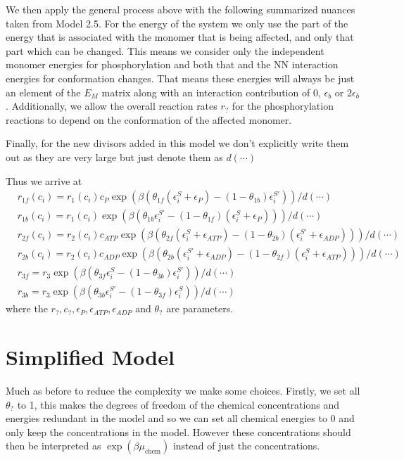 \documentclass[11pt]{article}
\begin{document}
\begin{tcolorbox}
	We then apply the general process above with the following summarized nuances taken from Model 2.5.
	For the energy of the system we only use the part of the energy that is associated with the monomer that is being affected, and only that part which can be changed.
	This means we consider only the independent monomer energies for phosphorylation and both that and the NN interaction energies for conformation changes.
	That means these energies will always be just an element of the $E_M$ matrix along with an interaction contribution of 0, $\epsilon_b$ or $2\epsilon_b$.
	Additionally, we allow the overall reaction rates $r_?$ for the phosphorylation reactions to depend on the conformation of the affected monomer.

    Finally, for the new divisors added in this model we don't explicitly write them out as they are very large but just denote them as $d(\cdots)$

	Thus we arrive at
	\begin{align}
        & r_{1f}(c_i) = r_1(c_i)c_P\exp(\beta(\theta_{1f}(\epsilon_i^S+\epsilon_P)-(1-\theta_{1b})\epsilon_i^{S'})) / d(\cdots) \label{eq:rate1f}                          \\
         & r_{1b}(c_i) = r_1(c_i)\exp(\beta(\theta_{1b}\epsilon_i^{S'}-(1-\theta_{1f})(\epsilon_i^S+\epsilon_P))) / d(\cdots) \label{eq:rate1b}                             \\
         & r_{2f}(c_i) = r_2(c_i)c_{ATP}\exp(\beta(\theta_{2f}(\epsilon_i^S+\epsilon_{ATP})-(1-\theta_{2b})(\epsilon_i^{S'}+\epsilon_{ADP}))) / d(\cdots) \label{eq:rate2f} \\
         & r_{2b}(c_i) = r_2(c_i)c_{ADP}\exp(\beta(\theta_{2b}(\epsilon_i^{S'}+\epsilon_{ADP})-(1-\theta_{2f})(\epsilon_i^S+\epsilon_{ATP}))) / d(\cdots) \label{eq:rate2b} \\
         & r_{3f} = r_3\exp(\beta(\theta_{3f}\epsilon_i^S-(1-\theta_{3b})\epsilon_i^{S'})) / d(\cdots) \label{eq:rate3f}                                                    \\
         & r_{3b} = r_3\exp(\beta(\theta_{3b}\epsilon_i^{S'}-(1-\theta_{3f})\epsilon_i^S)) / d(\cdots) \label{eq:rate3b}
	\end{align}
	where the $r_?,c_?,\epsilon_P,\epsilon_{ATP},\epsilon_{ADP}$ and $\theta_?$ are parameters.
\end{tcolorbox}

\section{Simplified Model}
Much as before to reduce the complexity we make some choices.
Firstly, we set all $\theta_?$ to 1, this makes the degrees of freedom of the chemical concentrations and energies redundant in the model and so we can set all chemical energies to 0 and only keep the concentrations in the model.
However these concentrations should then be interpreted as $\exp(\beta \mu_\text{chem})$ instead of just the concentrations.
\end{document}
